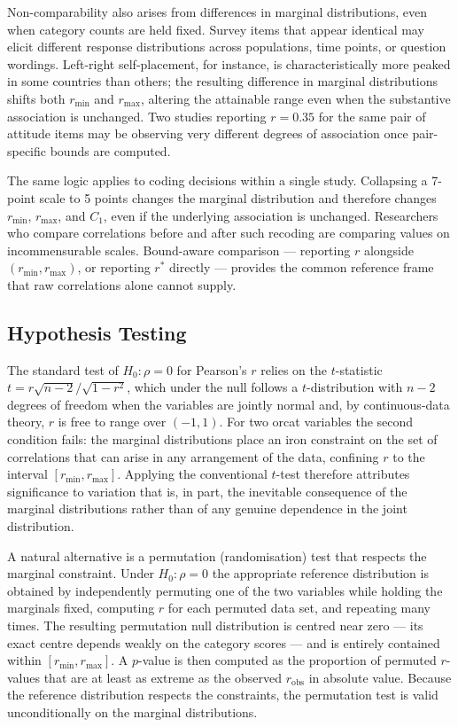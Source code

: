 \documentclass[
  12pt,
]{article}
\theoremstyle{plain}
\theoremstyle{definition}
\theoremstyle{remark}
\begin{document}
Non-comparability also arises from differences in marginal
distributions, even when category counts are held fixed. Survey items
that appear identical may elicit different response distributions across
populations, time points, or question wordings. Left-right
self-placement, for instance, is characteristically more peaked in some
countries than others; the resulting difference in marginal
distributions shifts both \(r_{\min}\) and \(r_{\max}\), altering the
attainable range even when the substantive association is unchanged. Two
studies reporting \(r = 0.35\) for the same pair of attitude items may
be observing very different degrees of association once pair-specific
bounds are computed.

The same logic applies to coding decisions within a single study.
Collapsing a 7-point scale to 5 points changes the marginal distribution
and therefore changes \(r_{\min}\), \(r_{\max}\), and \(C_1\), even if
the underlying association is unchanged. Researchers who compare
correlations before and after such recoding are comparing values on
incommensurable scales. Bound-aware comparison --- reporting \(r\)
alongside \((r_{\min}, r_{\max})\), or reporting \(r^*\) directly ---
provides the common reference frame that raw correlations alone cannot
supply.

\subsection{Hypothesis Testing}\label{sec-implications-hyp}

The standard test of \(H_0\colon \rho = 0\) for Pearson's \(r\) relies
on the \(t\)-statistic \(t = r\sqrt{n-2}/\sqrt{1-r^2}\), which under the
null follows a \(t\)-distribution with \(n-2\) degrees of freedom when
the variables are jointly normal and, by continuous-data theory, \(r\)
is free to range over \((-1,1)\). For two orcat variables the second
condition fails: the marginal distributions place an iron constraint on
the set of correlations that can arise in any arrangement of the data,
confining \(r\) to the interval \([r_{\min}, r_{\max}]\). Applying the
conventional \(t\)-test therefore attributes significance to variation
that is, in part, the inevitable consequence of the marginal
distributions rather than of any genuine dependence in the joint
distribution.

A natural alternative is a permutation (randomisation) test that
respects the marginal constraint. Under \(H_0\colon \rho = 0\) the
appropriate reference distribution is obtained by independently
permuting one of the two variables while holding the marginals fixed,
computing \(r\) for each permuted data set, and repeating many times.
The resulting permutation null distribution is centred near zero --- its
exact centre depends weakly on the category scores --- and is entirely
contained within \([r_{\min}, r_{\max}]\). A \(p\)-value is then
computed as the proportion of permuted \(r\)-values that are at least as
extreme as the observed \(r_{\text{obs}}\) in absolute value. Because
the reference distribution respects the constraints, the permutation
test is valid unconditionally on the marginal distributions.
\end{document}
